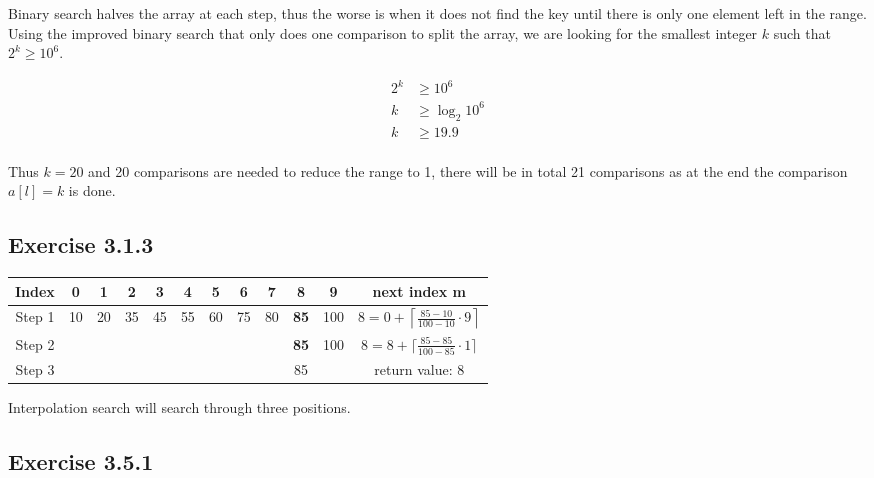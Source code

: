\documentclass{article}
\begin{document}
Binary search halves the array at each step, thus the worse is when it does not find the key until there is only one element left in the range. Using the improved binary search that only does one comparison to split the array, we are looking for the smallest integer \(k\) such that \(2^k \geq 10^6\). 

\begin{align*}
2^k &\geq 10^6 \\
k &\geq \log_2{10^6} \\
k &\geq 19.9 \\
\end{align*}

Thus \(k=20\) and 20 comparisons are needed to reduce the range to 1, there will be in total 21 comparisons as at the end the comparison \(a[l]=k\) is done. 


\subsection*{Exercise 3.1.3}

\begin{tabular}{|c|c|c|c|c|c|c|c|c|c|c|c|}
\hline
\textbf{Index}& 0& 1& 2& 3& 4& 5& 6& 7& 8& 9& \textbf{next index }m \\
\hline
Step 1& 10& 20& 35& 45& 55& 60& 75& 80& \textbf{85}& 100& \(8 = 0+ \left\lceil \frac{85-10}{100-10}\cdot 9 \right\rceil\) \\ 
\hline
Step 2& & & & & & & & & \textbf{85}& 100& \(8 = 8+ \lceil \frac{85-85}{100-85}\cdot 1 \rceil\) \\ 
\hline
Step 3& & & & & & & & & 85& & return value: 8 \\ 
\hline
\end{tabular}

Interpolation search will search through three positions.


\subsection*{Exercise 3.5.1}
\end{document}
